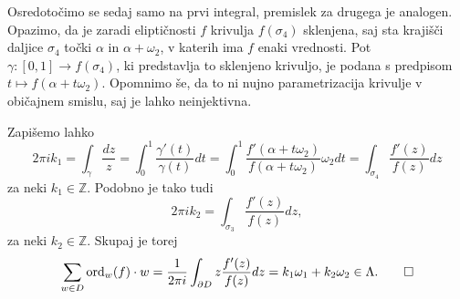 \documentclass[mat1]{fmfdelo}
\numberwithin{equation}{section}
\newcommand{\Z}{\mathbb Z}
\newcommand{\ord}[2]{\operatorname{ord}_{#1}(#2)}
\theoremstyle{definition}
\begin{document}
\begin{dokaz}
    Osredotočimo se sedaj samo na prvi integral, premislek za drugega je analogen. Opazimo, da je zaradi eliptičnosti $f$ krivulja $f(\sigma_4)$ sklenjena, saj sta krajišči daljice $\sigma_4$ točki $\alpha$ in $\alpha + \omega_2$, v katerih ima $f$ enaki vrednosti. Pot $\gamma : [0,1] \to f(\sigma_4)$, ki predstavlja to sklenjeno krivuljo, je podana s predpisom $t \mapsto f(\alpha + t\omega_2)$. Opomnimo še, da to ni nujno parametrizacija krivulje v običajnem smislu, saj je lahko neinjektivna. 
    
    Zapišemo lahko 
    \[
        2 \pi i k_1 = 
        \int_{\gamma} \frac{dz}{z} = 
        \int_0^1 \frac{\gamma'(t)}{\gamma(t)}dt =
        \int_0^1 \frac{f'(\alpha + t\omega_2)}{f(\alpha + t\omega_2)}\omega_2 dt = 
        \int_{\sigma_4} \frac{f'(z)}{f(z)}dz
    \]
    za neki $k_1 \in \Z$. Podobno je tako tudi
    \[
        2 \pi i k_2 = \int_{\sigma_3} \frac{f'(z)}{f(z)}dz,
    \]
    za neki $k_2 \in \Z$. Skupaj je torej 
    \[
        \sum_{w \in D} \ord{w}{f} \cdot w = 
        \frac{1}{2 \pi i} \int_{\partial D} z\frac{f'(z)}{f(z)}dz = 
        k_1 \omega_1 + k_2 \omega_2\in \Lambda. \qedhere
    \]
\end{dokaz}
\end{document}
